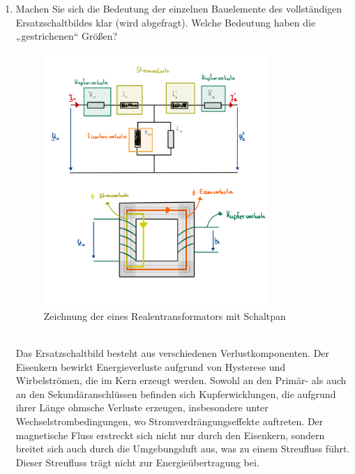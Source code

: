 \begin{enumerate}[label=\alph*)]
	      \pagebreak
	\item Machen Sie sich die Bedeutung der einzelnen Bauelemente des vollständigen
	      Ersatzschaltbildes klar (wird abgefragt). Welche Bedeutung haben die
	      „gestrichenen“ Größen?
	      \begin{figure}[h!]
		      \begin{center}
			      \includegraphics[width=0.8\textwidth]{img/2.1.2.4.png}
		      \end{center}
		      \caption{Zeichnung der eines Realentransformators mit Schaltpan }\label{img/2.1.2.4}
	      \end{figure}
	      \\
	      Das Ersatzschaltbild besteht aus verschiedenen Verlustkomponenten. Der Eisenkern bewirkt Energieverluste aufgrund von Hysterese und Wirbelströmen, die im Kern erzeugt werden. Sowohl an den Primär- als auch an den Sekundäranschlüssen befinden sich Kupferwicklungen, die aufgrund ihrer Länge ohmsche Verluste erzeugen, insbesondere unter Wechselstrombedingungen, wo Stromverdrängungseffekte auftreten. Der magnetische Fluss erstreckt sich nicht nur durch den Eisenkern, sondern breitet sich auch durch die Umgebungsluft aus, was zu einem Streufluss führt. Dieser Streufluss trägt nicht zur Energieübertragung bei.\\ \ \\
	      \begin{figure}[h!]
		      \begin{center}

\end{center}
\end{figure}
\end{enumerate}
